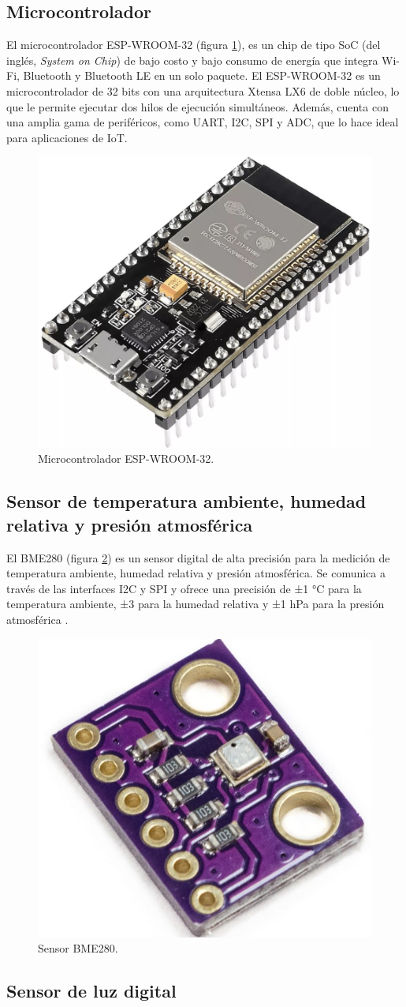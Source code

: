 \subsection{Microcontrolador}\label{sec:microcontrolador}

El microcontrolador ESP-WROOM-32 (figura \ref{fig:ESP32}), es un chip de tipo
SoC (del inglés, \textit{System on Chip}) de bajo costo y bajo consumo de
energía que integra Wi-Fi, Bluetooth y Bluetooth LE en un solo paquete. El
ESP-WROOM-32 \cite{EspressifESP32WROOM} es un microcontrolador de 32 bits con
una arquitectura Xtensa LX6 de doble núcleo, lo que le permite ejecutar dos
hilos de ejecución simultáneos. Además, cuenta con una amplia gama de
periféricos, como UART, I2C, SPI y ADC, que lo hace ideal para aplicaciones de
IoT.

\begin{figure}[H]
	\centering
	\includegraphics[height=.15\textwidth]{./Images/3.png}
	\caption{Microcontrolador ESP-WROOM-32.}
	\label{fig:ESP32}
\end{figure}

\subsection{Sensor de temperatura ambiente, humedad relativa y presión atmosférica}

El BME280 (figura \ref{fig:BME280}) es un sensor digital de alta precisión para
la medición de temperatura ambiente, humedad relativa y presión atmosférica. Se
comunica a través de las interfaces I2C y SPI y ofrece una precisión de ±1 °C
para la temperatura ambiente, ±3 \code{\%} para la humedad relativa y ±1 hPa
para la presión atmosférica \cite{BoschBME280}.

\begin{figure}[H]
	\centering
	\includegraphics[height=.15\textwidth]{./Images/4.png}
	\caption{Sensor BME280.}
	\label{fig:BME280}
\end{figure}

\subsection{Sensor de luz digital}\label{sec:BH1750}

